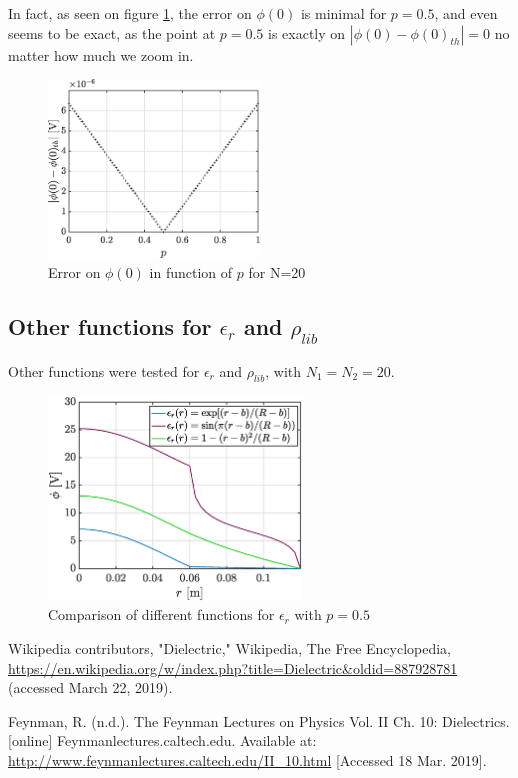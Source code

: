 \documentclass[a4paper,12pt,twoside]{article}
\begin{document}
      In fact, as seen on figure \ref{econv}, the error on $\phi(0)$ is minimal for $p=0.5$, and even seems to be exact, as the point at $p=0.5$ is exactly on $|\phi(0)-\phi(0)_{th}|=0$ no matter how much we zoom in.
      \begin{figure}[h]
      \centering
       \includegraphics[width=0.5\textwidth]{graphs/e_conv.eps}
       \caption{Error on $\phi(0)$ in function of $p$ for N=20}
       \label{econv}
      \end{figure}
      
      \subsection{Other functions for $\epsilon_r$ and $\rho_{lib}$}
      
      Other functions were tested for $\epsilon_r$ and $\rho_{lib}$, with $N_1=N_2=20$.

      \begin{figure}[h]
      \centering
       \includegraphics[width=0.6\textwidth]{graphs/eepsr.eps}
       \caption{Comparison of different functions for $\epsilon_r$ with $p=0.5$}
       \label{eepsr}
      \end{figure}
      
  \newpage
  \begin{thebibliography}{99}
     Wikipedia contributors, "Dielectric," Wikipedia, The Free Encyclopedia, \url{https://en.wikipedia.org/w/index.php?title=Dielectric&oldid=887928781} (accessed March 22, 2019).

     Feynman, R. (n.d.). The Feynman Lectures on Physics Vol. II Ch. 10: Dielectrics. [online] Feynmanlectures.caltech.edu. Available at: \url{http://www.feynmanlectures.caltech.edu/II_10.html} [Accessed 18 Mar. 2019].
  \end{thebibliography}
\end{document}
